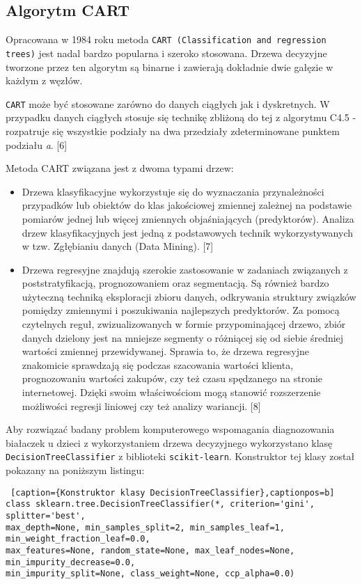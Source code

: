 \documentclass{article}
\begin{document}
\subsection{Algorytm CART}
\quad Opracowana w 1984 roku metoda \texttt{CART (Classification and regression trees)} jest
nadal bardzo popularna i szeroko stosowana. Drzewa decyzyjne tworzone przez ten algorytm
są binarne i zawierają dokładnie dwie gałęzie w każdym z węzłów.

\texttt{CART} może być stosowane zarówno do danych ciągłych jak i dyskretnych. W
przypadku danych ciągłych stosuje się technikę zbliżoną do tej z algorytmu C4.5 - rozpatruje
się wszystkie podziały na dwa przedziały zdeterminowane punktem podziału \textsl{a}. [6]

Metoda CART związana jest z dwoma typami drzew:
\begin{itemize}{}
    \item Drzewa klasyfikacyjne wykorzystuje się do wyznaczania przynależności przypadków lub obiektów do klas jakościowej zmiennej zależnej na podstawie pomiarów jednej lub więcej zmiennych objaśniających (predyktorów). Analiza drzew klasyfikacyjnych jest jedną z podstawowych technik wykorzystywanych w tzw. Zgłębianiu danych (Data Mining). [7]
    \item Drzewa regresyjne znajdują szerokie zastosowanie w zadaniach związanych z poststratyfikacją, prognozowaniem oraz segmentacją. Są również bardzo użyteczną techniką eksploracji zbioru danych, odkrywania struktury związków pomiędzy zmiennymi i poszukiwania najlepszych predyktorów. Za pomocą czytelnych reguł, zwizualizowanych w formie przypominającej drzewo, zbiór danych dzielony jest na mniejsze segmenty o różniącej się od siebie średniej wartości zmiennej przewidywanej. Sprawia to, że drzewa regresyjne znakomicie sprawdzają się podczas szacowania wartości klienta, prognozowaniu wartości zakupów, czy też czasu spędzanego na stronie internetowej. Dzięki swoim właściwościom mogą stanowić rozszerzenie możliwości regresji liniowej czy też analizy wariancji. [8]
    
\end{itemize}

Aby rozwiązać badany problem komputerowego wspomagania diagnozowania białaczek u dzieci z wykorzystaniem drzewa decyzyjnego wykorzystano klasę \texttt{DecisionTreeClassifier} z biblioteki \texttt{scikit-learn}. Konstruktor tej klasy został pokazany na poniższym listingu:\\
\begin{lstlisting} [caption={Konstruktor klasy DecisionTreeClassifier},captionpos=b]
class sklearn.tree.DecisionTreeClassifier(*, criterion='gini', splitter='best', 
max_depth=None, min_samples_split=2, min_samples_leaf=1, min_weight_fraction_leaf=0.0, 
max_features=None, random_state=None, max_leaf_nodes=None, min_impurity_decrease=0.0,
min_impurity_split=None, class_weight=None, ccp_alpha=0.0)
\end{lstlisting}
\end{document}
